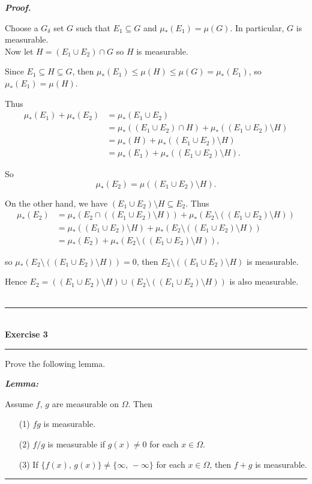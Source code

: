 \documentclass[a4paper,11pt]{article}
\begin{document}
\textbf{\textit{Proof.}}

Choose a $G_\delta$ set $G$ such that $E_1 \subseteq G$ and $\mu_*(E_1) = \mu(G)$. In particular, $G$ is measurable.\\

Now let $H = (E_1 \cup E_2) \cap G$ so $H$ is measurable.

Since $E_1 \subseteq H \subseteq G$, then $\mu_*(E_1) \leq \mu(H) \leq \mu(G) = \mu_*(E_1)$, so $\mu_*(E_1) = \mu(H)$.

Thus
	$$\begin{aligned}
	\mu_*(E_1) + \mu_*(E_2)
	&= \mu_*(E_1 \cup E_2)\\
	&= \mu_*((E_1 \cup E_2) \cap H) + \mu_*((E_1 \cup E_2) \setminus H)\\
	&= \mu_*(H) + \mu_*((E_1 \cup E_2) \setminus H)\\
	&= \mu_*(E_1) + \mu_*((E_1 \cup E_2) \setminus H).
	\end{aligned}$$

So
	$$\mu_*(E_2) = \mu((E_1 \cup E_2) \setminus H).$$

On the other hand, we have $(E_1 \cup E_2) \setminus H \subseteq E_2$. Thus
	$$\begin{aligned}
	\mu_*(E_2)
	&= \mu_*(E_2 \cap ((E_1 \cup E_2) \setminus H)) + \mu_*(E_2 \setminus ((E_1 \cup E_2) \setminus H))\\
	&= \mu_*((E_1 \cup E_2) \setminus H) + \mu_*(E_2 \setminus ((E_1 \cup E_2) \setminus H))\\
	&= \mu_*(E_2) + \mu_*(E_2 \setminus ((E_1 \cup E_2) \setminus H)),
	\end{aligned}$$

so $\mu_*(E_2 \setminus ((E_1 \cup E_2) \setminus H)) = 0$, then $E_2 \setminus ((E_1 \cup E_2) \setminus H)$ is measurable.

Hence $E_2 = ((E_1 \cup E_2) \setminus H) \cup (E_2 \setminus ((E_1 \cup E_2) \setminus H))$ is also measurable.\\\\



\begin{flushleft}
	\rule[-0.5ex]{17cm}{2pt}\\
		\textbf{Exercise 3}\\
	\rule[1.5ex]{17cm}{0.5pt}
		Prove the following lemma.

		\textbf{\textit{Lemma:}}

		Assume $f,\,g$ are measurable on $\Omega$. Then
		\begin{enumerate}
			\item[(1)] $fg$ is measurable.

			\item[(2)] $f/g$ is measurable if $g(x) \neq 0$ for each $x \in \Omega$.

			\item[(3)] If $\{f(x),\,g(x)\} \neq \{\infty,\,-\infty\}$ for each $x \in \Omega$, then $f + g$ is measurable.
		\end{enumerate}
	\rule[1.0ex]{17cm}{0.5pt}\
\end{flushleft}
\end{document}
